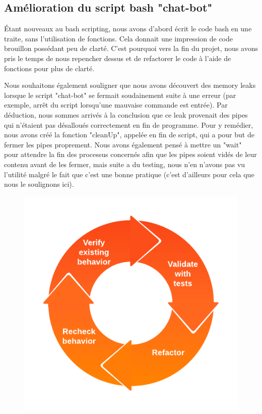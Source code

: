 \documentclass[utf8]{article}
\begin{document}
\subsection{Amélioration du script bash "chat-bot"}
Étant nouveaux au bash scripting, nous avons d'abord écrit le code bash en une traite, sans l'utilisation de fonctions. Cela donnait une impression de
code brouillon possédant peu de clarté. C'est pourquoi vers la fin du projet, nous avons pris le temps de nous repencher dessus et de refactorer le code à l'aide
de fonctions pour plus de clarté.

Nous souhaitons également souligner que nous avons découvert des memory leaks lorsque le script "chat-bot" se fermait soudainement suite à une erreur (par exemple, arrêt du
script lorsqu'une mauvaise commande est entrée). Par déduction, nous sommes arrivés à la conclusion que ce leak provenait des pipes qui n'étaient pas désalloués correctement
en fin de programme. Pour y remédier, nous avons créé la fonction "cleanUp", appelée en fin de script, qui a pour but de fermer les pipes proprement. Nous avons également pensé
à mettre un "wait" pour attendre la fin des processus concernés afin que les pipes soient vidés de leur contenu avant de les fermer, mais suite a du testing, nous n'en n'avons pas
vu l'utilité malgré le fait que c'est une bonne pratique (c'est d'ailleurs pour cela que nous le soulignons ici).

\begin{figure}[H]
    \centering
    \includegraphics[scale=0.4]{refactoring.png}
\end{figure}
\end{document}
